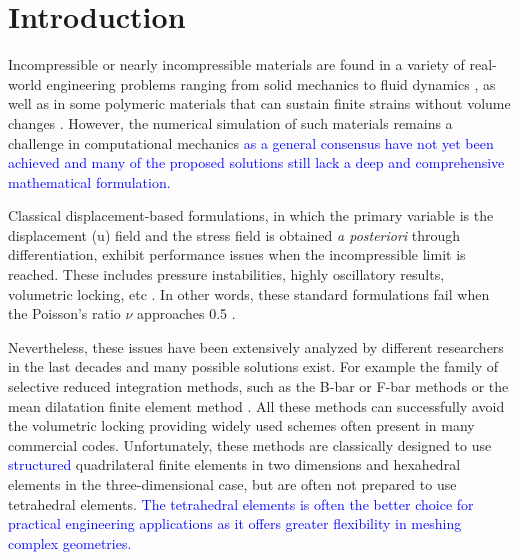 \documentclass[11pt,english]{article}
\newcommand{\LM}[1]{\textcolor{blue}{#1}}
\newcommand{\AL}[1]{\marginnote{\textbf{AL}:\textcolor{red}{#1}}}
\begin{document}
\section{Introduction}


Incompressible or nearly incompressible materials are found in a variety of real-world engineering problems ranging from solid mechanics to fluid dynamics \cite{zienkiewicz2005finite}, as well as in some polymeric materials that can sustain finite strains without volume changes \cite{holzapfel2002nonlinear}.
However, the numerical simulation of such materials remains a challenge in computational mechanics \LM{as a general consensus have not yet been achieved and many of the proposed solutions still lack a deep and comprehensive mathematical formulation.}

Classical displacement-based formulations, in which the primary variable is the displacement (u) field and the stress field is obtained \textit{a posteriori} through differentiation, exhibit performance issues  when the incompressible limit is reached. These includes pressure instabilities, highly oscillatory results, volumetric locking, etc  \cite{belytschko2000nonlinear}. In other words, these standard formulations fail when the Poisson's ratio $\nu$ approaches 0.5 \cite{zienkiewicz2005finite}.

Nevertheless, these issues have been extensively analyzed by different researchers in the last decades and many possible solutions exist. For example the family of selective reduced integration methods, such as the B-bar \cite{hughes1980generalization} or F-bar methods \cite{de1996design} or the mean dilatation finite element method \cite{nagtegaal1974numerically}. All these methods can successfully avoid the volumetric locking \cite{hughes2012finite} providing  widely used schemes often present in many commercial codes. 
Unfortunately, these methods are classically designed to use \LM{structured} quadrilateral finite elements in two dimensions and hexahedral elements in the three-dimensional case, but are often not prepared to use tetrahedral elements. \LM{The tetrahedral elements is often the better choice for practical engineering applications as it offers greater flexibility in meshing complex geometries.} 

\end{document}
